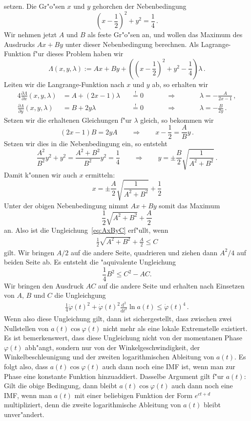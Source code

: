 \documentclass[a4paper]{scrartcl}
\newcommand{\de}{{\mathrm{d}}}
\newcommand{\pphi}{{\varphi}}
\newcommand{\defeq}{\overset{!}{=}}
\begin{document}
setzen. Die Gr"o"sen $x$ und $y$ gehorchen der Nebenbedingung
$$ \left(x-\frac12\right)^2 + y^2 = \frac14\,. $$
Wir nehmen jetzt $A$ und $B$ als feste Gr"o"sen an, und wollen das Maximum des Ausdrucks $Ax+By$ unter dieser Nebenbedingung berechnen. Als Lagrange-Funktion f"ur dieses Problem haben wir
$$ \Lambda(x,y,\lambda) 
:= Ax + By + \left( \left(x-\frac12\right)^2 + y^2 - \frac14 \right) \lambda \,. $$
Leiten wir die Langrange-Funktion nach $x$ und $y$ ab, so erhalten wir
\begin{alignat*}{4}
  \frac{\partial\Lambda}{\partial x}(x,y,\lambda) &= A + (2x-1)\lambda &&\defeq 0 
  &\qquad&\Longrightarrow &\qquad& \lambda = -\frac{A}{2x-1}\,, \\
  \frac{\partial\Lambda}{\partial y}(x,y,\lambda) &= B +  2y   \lambda &&\defeq 0 
  && \Longrightarrow && \lambda = -\frac{B}{2y}\,.
\end{alignat*}
Setzen wir die erhaltenen Gleichungen f"ur $\lambda$ gleich, so bekommen wir 
$$ (2x-1)B = 2yA \qquad \Longrightarrow \qquad
x-\frac12 = \frac AB y\,. $$
Setzen wir dies in die Nebenbedingung ein, so entsteht
$$ \frac{A^2}{B^2}y^2 + y^2 = \frac{A^2+B^2}{B^2}y^2 
= \frac14 \qquad \Longrightarrow \qquad
y=\pm\frac B2\sqrt{\frac{1}{A^2+B^2}}\,. $$
Damit k"onnen wir auch $x$ ermitteln:
$$ x = \pm\frac A2\sqrt{\frac{1}{A^2+B^2}} + \frac12 $$
Unter der obigen Nebenbedingung nimmt $Ax+By$ somit das Maximum
$$ \frac12 \sqrt{A^2+B^2}+\frac A2 $$
an. Also ist die Ungleichung~\eqref{eq:AxByC} erf"ullt, wenn 
\begin{align} \label{eq:intermediateABC}
  \frac12\sqrt{A^2+B^2}+\frac A2 \le C 
\end{align}
gilt. Wir bringen $A/2$ auf die andere Seite, quadrieren und ziehen dann $A^2/4$ auf beiden Seite ab. Es entsteht die "aquivalente Ungleichung
$$ \frac14 B^2 \le C^2 - AC. $$
Wir bringen den Ausdruck $AC$ auf die andere Seite und erhalten nach Einsetzen von $A$, $B$ und $C$ die Ungleichgung
\begin{align} \label{eq:condpphiiai}
  \frac14\ddot\pphi(t)^2 + \dot\pphi(t)^2\frac{\de^2}{\de t^2}\ln a(t) 
  \le \dot\pphi(t)^4\,.
\end{align}
Wenn also diese Ungleichung gilt, dann ist sichergestellt, dass zwischen zwei Nullstellen von $a(t)\cos\pphi(t)$ nicht mehr als eine lokale Extremstelle existiert. Es ist bemerkenswert, dass diese Ungleichung nicht von der momentanen Phase $\pphi(t)$ abh"angt, sondern nur von der Winkelgeschwindigkeit, der Winkelbeschleunigung und der zweiten logarithmischen Ableitung von $a(t)$. Es folgt also, dass $a(t)\cos\pphi(t)$ auch dann noch eine IMF ist, wenn man zur Phase eine konstante Funktion hinzuaddiert. Dasselbe Argument gilt f"ur $a(t)$: Gilt die obige Bedingung, dann bleibt $a(t)\cos\pphi(t)$ auch dann noch eine IMF, wenn man  $a(t)$ mit einer beliebigen Funktion der Form $e^{ct+d}$ multipliziert, denn die zweite logarithmische Ableitung von $a(t)$ bleibt unver"andert. 
\end{document}
